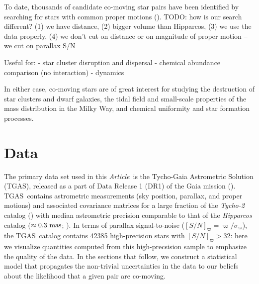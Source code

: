 \documentclass[manuscript, letterpaper]{aastex6}
\newcommand{\project}[1]{\textsl{#1}}
\newcommand{\acronym}[1]{{\small{#1}}}
\newcommand{\documentname}{\textsl{Article}}
\newcommand{\dr}{\acronym{DR1}}
\newcommand{\tgas}{\acronym{TGAS}}
\newcommand{\kms}{\rm km~s^{-1}}
\newcommand{\snr}{[S/N]_\varpi}
\newcommand{\todo}[1]{{\color{red}TODO: #1}}
\begin{document}
To date, thousands of candidate co-moving star pairs have been identified by
searching for stars with common proper motions (\citealt{Luyten:1979,
Poveda:1994, Allen:2000, Gould:2003, Chaname:2004, Lepine:2007,
Alonso-Floriano:2015}). \todo{how is our search different? (1) we have distance, (2) bigger volume than Hipparcos, (3) we use the data properly, (4) we don't cut on distance or on magnitude of proper motion -- we cut on parallax S/N}



Useful for:
- star cluster disruption and dispersal
- chemical abundance comparison (no interaction)
- dynamics

In either case, co-moving stars are of great interest
for studying the destruction of star clusters and dwarf galaxies, the tidal
field and small-scale properties of the mass distribution in the Milky Way, and
chemical uniformity and star formation processes.

\section{Data} \label{sec:data}

The primary data set used in this \documentname\ is the Tycho-Gaia Astrometric
Solution (\tgas), released as a part of Data Release 1 (\dr) of the Gaia mission
(\citealt{many}). \tgas\ contains astrometric measurements (sky position,
parallax, and proper motions) and associated covariance matrices for a large
fraction of the \project{Tycho-2} catalog (\citealt{tycho2}) with median
astrometric precision comparable to that of the \project{Hipparcos} catalog
($\approx 0.3~{\rm mas}$; \citealt{hipparcos}). In terms of parallax
signal-to-noise ($\snr = \varpi/\sigma_\varpi$), the \tgas\ catalog contains
42385 high-precision stars with $\snr > 32$: here we visualize quantities
computed from this high-precsision sample to emphasize the quality of the data.
In the sections that follow, we construct a statistical model that propagates
the non-trivial uncertainties in the data to our beliefs about the likelihood
that a given pair are co-moving.
\end{document}
